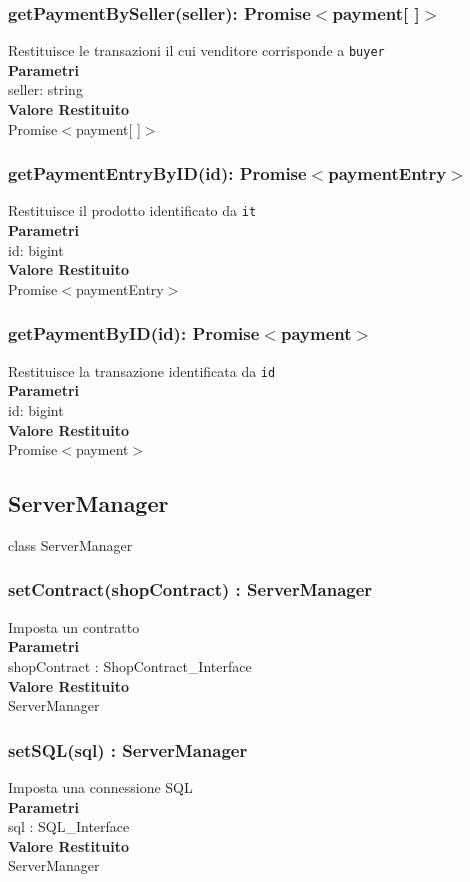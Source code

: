 \documentclass[a4paper, 12pt]{article}
\begin{document}
\subsubsection{getPaymentBySeller(seller): Promise$<$payment[ ]$>$}
Restituisce le transazioni il cui venditore corrisponde a \texttt{buyer}\\
\textbf{Parametri}\\
seller: string\\
\textbf{Valore Restituito}\\
Promise$<$payment[ ]$>$
\subsubsection{getPaymentEntryByID(id): Promise$<$paymentEntry$>$}
Restituisce il prodotto identificato da \texttt{it}\\
\textbf{Parametri}\\
id: bigint\\
\textbf{Valore Restituito}\\
Promise$<$paymentEntry$>$
\subsubsection{getPaymentByID(id): Promise$<$payment$>$}
Restituisce la transazione identificata da \texttt{id}\\
\textbf{Parametri}\\
id: bigint\\
\textbf{Valore Restituito}\\
Promise$<$payment$>$

\subsection{ServerManager}
class ServerManager
\subsubsection{setContract(shopContract) : ServerManager}
Imposta un contratto\\
\textbf{Parametri}\\
shopContract : ShopContract\_Interface\\
\textbf{Valore Restituito}\\
ServerManager\\
\subsubsection{setSQL(sql) : ServerManager}
Imposta una connessione SQL\\
\textbf{Parametri}\\
sql : SQL\_Interface\\
\textbf{Valore Restituito}\\
ServerManager
\end{document}
